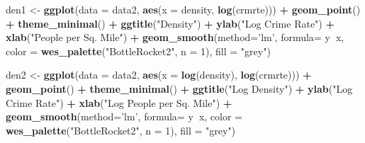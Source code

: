 \documentclass[]{article}
\newenvironment{Shaded}{\begin{snugshade}}{\end{snugshade}}
\newcommand{\DataTypeTok}[1]{\textcolor[rgb]{0.13,0.29,0.53}{#1}}
\newcommand{\DecValTok}[1]{\textcolor[rgb]{0.00,0.00,0.81}{#1}}
\newcommand{\KeywordTok}[1]{\textcolor[rgb]{0.13,0.29,0.53}{\textbf{#1}}}
\newcommand{\NormalTok}[1]{#1}
\newcommand{\OperatorTok}[1]{\textcolor[rgb]{0.81,0.36,0.00}{\textbf{#1}}}
\newcommand{\StringTok}[1]{\textcolor[rgb]{0.31,0.60,0.02}{#1}}
\begin{document}
\begin{Shaded}
\begin{Highlighting}[]
\NormalTok{den1 <-}\StringTok{ }\KeywordTok{ggplot}\NormalTok{(}\DataTypeTok{data =}\NormalTok{ data2, }\KeywordTok{aes}\NormalTok{(}\DataTypeTok{x =}\NormalTok{ density, }\KeywordTok{log}\NormalTok{(crmrte))) }\OperatorTok{+}
\StringTok{  }\KeywordTok{geom_point}\NormalTok{() }\OperatorTok{+}
\StringTok{  }\KeywordTok{theme_minimal}\NormalTok{() }\OperatorTok{+}
\StringTok{  }\KeywordTok{ggtitle}\NormalTok{(}\StringTok{"Density"}\NormalTok{) }\OperatorTok{+}\StringTok{ }
\StringTok{  }\KeywordTok{ylab}\NormalTok{(}\StringTok{"Log Crime Rate"}\NormalTok{) }\OperatorTok{+}\StringTok{ }\KeywordTok{xlab}\NormalTok{(}\StringTok{"People per Sq. Mile"}\NormalTok{) }\OperatorTok{+}
\StringTok{  }\KeywordTok{geom_smooth}\NormalTok{(}\DataTypeTok{method=}\StringTok{'lm'}\NormalTok{, }\DataTypeTok{formula=}\NormalTok{ y}\OperatorTok{~}\NormalTok{x, }\DataTypeTok{color =} \KeywordTok{wes_palette}\NormalTok{(}\StringTok{"BottleRocket2"}\NormalTok{, }\DataTypeTok{n =} \DecValTok{1}\NormalTok{), }\DataTypeTok{fill =} \StringTok{"grey"}\NormalTok{)}

\NormalTok{den2 <-}\StringTok{ }\KeywordTok{ggplot}\NormalTok{(}\DataTypeTok{data =}\NormalTok{ data2, }\KeywordTok{aes}\NormalTok{(}\DataTypeTok{x =} \KeywordTok{log}\NormalTok{(density), }\KeywordTok{log}\NormalTok{(crmrte))) }\OperatorTok{+}
\StringTok{  }\KeywordTok{geom_point}\NormalTok{() }\OperatorTok{+}
\StringTok{  }\KeywordTok{theme_minimal}\NormalTok{() }\OperatorTok{+}
\StringTok{  }\KeywordTok{ggtitle}\NormalTok{(}\StringTok{"Log Density"}\NormalTok{) }\OperatorTok{+}\StringTok{ }
\StringTok{  }\KeywordTok{ylab}\NormalTok{(}\StringTok{"Log Crime Rate"}\NormalTok{) }\OperatorTok{+}\StringTok{ }\KeywordTok{xlab}\NormalTok{(}\StringTok{"Log People per Sq. Mile"}\NormalTok{) }\OperatorTok{+}
\StringTok{  }\KeywordTok{geom_smooth}\NormalTok{(}\DataTypeTok{method=}\StringTok{'lm'}\NormalTok{, }\DataTypeTok{formula=}\NormalTok{ y}\OperatorTok{~}\NormalTok{x, }\DataTypeTok{color =} \KeywordTok{wes_palette}\NormalTok{(}\StringTok{"BottleRocket2"}\NormalTok{, }\DataTypeTok{n =} \DecValTok{1}\NormalTok{), }\DataTypeTok{fill =} \StringTok{"grey"}\NormalTok{)}


\end{Highlighting}
\end{Shaded}
\end{document}
